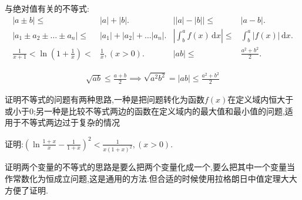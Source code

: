 与绝对值有关的不等式:
\begin{align*}
    \left\lvert a\pm b\right\rvert \leqslant & \left\lvert a\right\rvert +\left\lvert b\right\rvert .&
    \left\lvert \left\lvert a\right\rvert -\left\lvert b\right\rvert \right\rvert \leqslant & \left\lvert a-b\right\rvert. \\
    \left\lvert a_1\pm a_2\pm \dots\pm a_n\right\rvert  \leqslant & \left\lvert a_1\right\rvert +\left\lvert a_2\right\rvert + \dots \left\lvert a_n\right\rvert. &
    \left\lvert \int_{b}^{a} f(x) \,\mathrm{d}x \right\rvert \leqslant & \int_{b}^{a} \left\lvert f(x)\right\rvert  \,\mathrm{d}x.\\
    \frac{1}{x+1}<\ln \left(1+\frac1x \right) < & \frac{1}{x} ,(x>0). &
    \left\lvert ab\right\rvert \leqslant & \frac{a^2+b^2}{2}.
\end{align*}
\begin{prf}
    \begin{gather*}
        \sqrt{ab} \leqslant\frac{a+b}{2}\implies \sqrt{a^2b^2} =\left\lvert ab\right\rvert \leqslant\frac{a^2+b^2}{2}
    \end{gather*}
\end{prf}
证明不等式的问题有两种思路,一种是把问题转化为函数$f(x)$在定义域内恒大于或小于0;另一种是比较不等式两边的函数在定义域内的最大值和最小值的问题,适用于不等式两边过于复杂的情况
\begin{examp}{证明:$\left(\ln \frac{1+x}{x}-\frac{1}{1+x}\right) ^2<\frac{1}{x(1+x)^2},(x>0).$}
\end{examp}

证明两个变量的不等式的思路是要么把两个变量化成一个,要么把其中一个变量当作常数化为恒成立问题,这是通用的方法.但合适的时候使用拉格朗日中值定理大大方便了证明.

